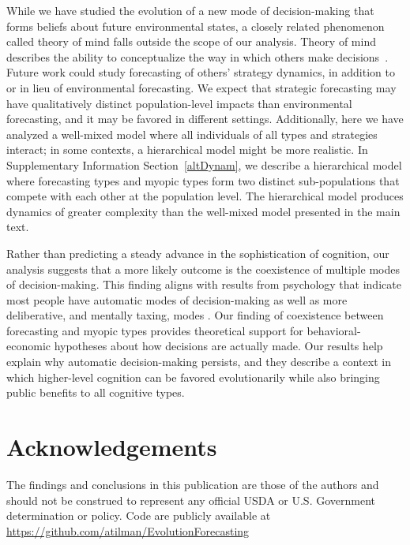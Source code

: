 \documentclass{article}
\begin{document}
While we have studied the evolution of a new mode of decision-making that forms  beliefs about future environmental states, a closely related phenomenon called theory of mind falls outside the scope of our analysis. Theory of mind describes the ability to conceptualize the way in which others make decisions~\citep{apperly2012}. Future work could study forecasting of others' strategy dynamics, in addition to or in lieu of environmental forecasting. We expect that strategic forecasting may have qualitatively distinct population-level impacts than environmental forecasting, and it may be favored in different settings. Additionally, here we have analyzed a well-mixed model where all individuals of all types and strategies interact; in some contexts, a hierarchical model might be more realistic. In Supplementary Information Section~\ref{altDynam}, we describe a hierarchical model where forecasting types and myopic types form two distinct sub-populations that compete with each other at the population level. The hierarchical model produces dynamics of greater complexity than the well-mixed model presented in the main text.

Rather than predicting a steady advance in the sophistication of cognition, our analysis suggests that a more likely outcome is the coexistence of multiple modes of decision-making. This finding aligns with results from psychology that indicate  most people have automatic modes of decision-making as well as more deliberative, and mentally taxing, modes \citep{kahneman2011thinking,rand2017}. Our finding of coexistence between forecasting and myopic types provides theoretical support for behavioral-economic hypotheses about how decisions are actually made. Our results help explain why automatic decision-making persists, and they describe a context in which higher-level cognition can be favored evolutionarily while also bringing public benefits to all cognitive types.

\section*{Acknowledgements}
The findings and conclusions in this publication are those of the authors and should not be construed to represent any official USDA or U.S. Government determination or policy. Code are publicly available at \url{https://github.com/atilman/EvolutionForecasting}




\renewcommand{\figurename}{SI Figure}
\end{document}
